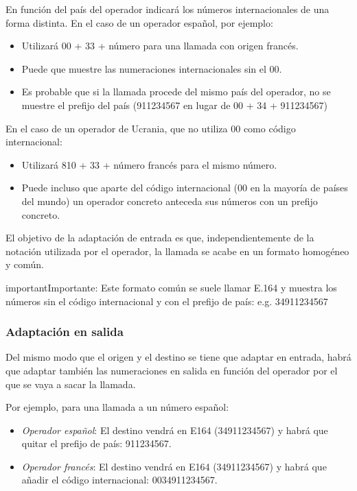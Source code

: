 \documentclass[letterpaper,10pt,spanish]{sphinxmanual}
\begin{document}
En función del país del operador indicará los números internacionales de una forma distinta. En el caso de un operador español, por ejemplo:
\begin{itemize}
\item {} 
Utilizará 00 + 33 + número para una llamada con origen francés.

\item {} 
Puede que muestre las numeraciones internacionales sin el 00.

\item {} 
Es probable que si la llamada procede del mismo país del operador, no se muestre el prefijo del país (911234567 en lugar de 00 + 34 + 911234567)

\end{itemize}

En el caso de un operador de Ucrania, que no utiliza 00 como código internacional:
\begin{itemize}
\item {} 
Utilizará 810 + 33 + número francés para el mismo número.

\item {} 
Puede incluso que aparte del código internacional (00 en la mayoría de países del mundo) un operador concreto anteceda sus números con un prefijo concreto.

\end{itemize}

El objetivo de la adaptación de entrada es que, independientemente de la notación utilizada por el operador, la llamada se acabe en un formato homogéneo y común.
\label{external_incoming_calls/numeric_transformations:e164}
\begin{notice}{important}{Importante:}
Este formato común se suele llamar E.164 y muestra los números sin el código internacional y con el prefijo de país: e.g. 34911234567
\end{notice}


\subsubsection{Adaptación en salida}
\label{external_incoming_calls/numeric_transformations:outgoing-transformations}
Del mismo modo que el origen y el destino se tiene que adaptar en entrada, habrá que adaptar también las numeraciones en salida en función del operador por el que se vaya a sacar la llamada.

Por ejemplo, para una llamada a un número español:
\begin{itemize}
\item {} 
\emph{Operador español}: El destino vendrá en E164 (34911234567) y habrá que quitar el prefijo de país: 911234567.

\item {} 
\emph{Operador francés}: El destino vendrá en E164 (34911234567) y habrá que añadir el código internacional: 0034911234567.

\end{itemize}
\end{document}
